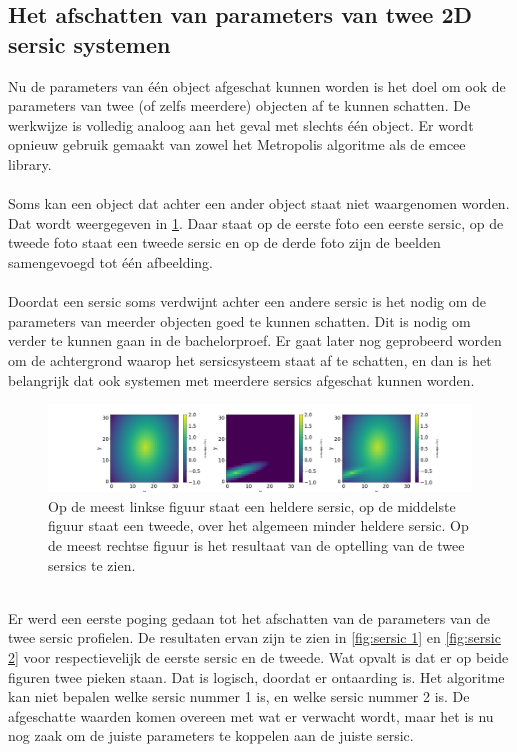 \subsection{Het afschatten van parameters van twee 2D sersic systemen}
Nu de parameters van één object afgeschat kunnen worden is het doel om ook de parameters van twee (of zelfs meerdere) objecten af te kunnen schatten. De werkwijze is volledig analoog aan het geval met slechts één object. Er wordt opnieuw gebruik gemaakt van zowel het Metropolis algoritme als de emcee library. \\ \\
Soms kan een object dat achter een ander object staat niet waargenomen worden. Dat wordt weergegeven in \cref{fig:2_sersic}. Daar staat op de eerste foto een eerste sersic, op de tweede foto staat een tweede sersic en op de derde foto zijn de beelden samengevoegd tot één afbeelding. \\ \\
Doordat een sersic soms verdwijnt achter een andere sersic is het nodig om de parameters van meerder objecten goed te kunnen schatten. Dit is nodig om verder te kunnen gaan in de bachelorproef. Er gaat later nog geprobeerd worden om de achtergrond waarop het sersicsysteem staat af te schatten, en dan is het belangrijk dat ook systemen met meerdere sersics afgeschat kunnen worden. 
\begin{figure}
    \centering
    \includegraphics[width=0.99\linewidth]{Figures/figuur_2D_zonder_package_10_8_1_0.3_1.5.png}
    \caption{Op de meest linkse figuur staat een heldere sersic, op de middelste figuur staat een tweede, over het algemeen minder heldere sersic. Op de meest rechtse figuur is het resultaat van de optelling van de twee sersics te zien.}
    \label{fig:2_sersic}
\end{figure}\mbox{}\\
Er werd een eerste poging gedaan tot het afschatten van de parameters van de twee sersic profielen. De resultaten ervan zijn te zien in \cref{fig:sersic 1} en \cref{fig:sersic 2} voor respectievelijk de eerste sersic en de tweede. Wat opvalt is dat er op beide figuren twee pieken staan. Dat is logisch, doordat er ontaarding is. Het algoritme kan niet bepalen welke sersic nummer 1 is, en welke sersic nummer 2 is. De afgeschatte waarden komen overeen met wat er verwacht wordt, maar het is nu nog zaak om de juiste parameters te koppelen aan de juiste sersic.

